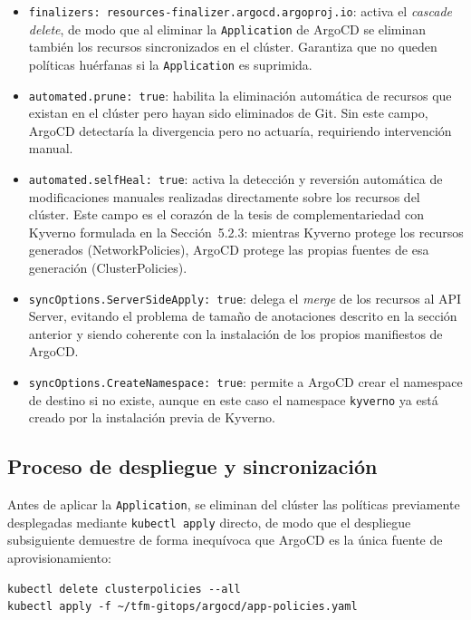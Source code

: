 \begin{itemize}
  \item \texttt{finalizers: resources-finalizer.\allowbreak{}argocd.argoproj.io}: activa el \textit{cascade delete}, de modo que al eliminar la \texttt{Application} de ArgoCD se eliminan también los recursos sincronizados en el clúster. Garantiza que no queden políticas huérfanas si la \texttt{Application} es suprimida.
  \item \texttt{automated.prune:\,true}: habilita la eliminación automática de recursos que existan en el clúster pero hayan sido eliminados de Git. Sin este campo, ArgoCD detectaría la divergencia pero no actuaría, requiriendo intervención manual.
  \item \texttt{automated.selfHeal:\,true}: activa la detección y reversión automática de modificaciones manuales realizadas directamente sobre los recursos del clúster. Este campo es el corazón de la tesis de complementariedad con Kyverno formulada en la Sección~5.2.3: mientras Kyverno protege los recursos generados (NetworkPolicies), ArgoCD protege las propias fuentes de esa generación (ClusterPolicies).
  \item \texttt{syncOptions.ServerSideApply:\,true}: delega el \textit{merge} de los recursos al API Server, evitando el problema de tamaño de anotaciones descrito en la sección anterior y siendo coherente con la instalación de los propios manifiestos de ArgoCD.
  \item \texttt{syncOptions.CreateNamespace:\,true}: permite a ArgoCD crear el namespace de destino si no existe, aunque en este caso el namespace \texttt{kyverno} ya está creado por la instalación previa de Kyverno.
\end{itemize}

\subsection{Proceso de despliegue y sincronización}

Antes de aplicar la \texttt{Application}, se eliminan del clúster las políticas previamente desplegadas mediante \texttt{kubectl apply} directo, de modo que el despliegue subsiguiente demuestre de forma inequívoca que ArgoCD es la única fuente de aprovisionamiento:

\begin{lstlisting}
kubectl delete clusterpolicies --all
kubectl apply -f ~/tfm-gitops/argocd/app-policies.yaml
\end{lstlisting}


